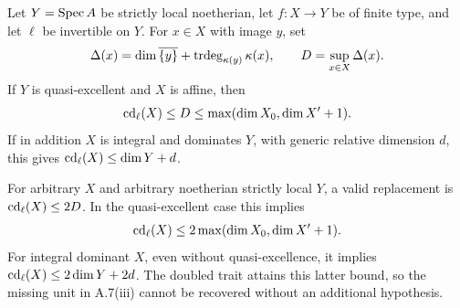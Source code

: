 \begin{theorem}
\label{A:relative-affine}
Let $Y=\operatorname{Spec} A$ be strictly local noetherian, let $f:X\to Y$ be of finite type, and let $\ell$ be invertible on $Y$. For $x\in X$ with image $y$, set
\[
\Delta(x)=\dim\overline{\{y\}}+\operatorname{trdeg}_{\kappa(y)}\kappa(x),
\qquad D=\sup_{x\in X}\Delta(x).
\]
If $Y$ is quasi-excellent and $X$ is affine, then
\[
\operatorname{cd}_\ell(X)\leq D\leq\max(\dim X_0,\dim X'+1).
\]
If in addition $X$ is integral and dominates $Y$, with generic relative dimension $d$, this gives $\operatorname{cd}_\ell(X)\leq\dim Y+d$.

For arbitrary $X$ and arbitrary noetherian strictly local $Y$, a valid replacement is $\operatorname{cd}_\ell(X)\leq2D$. In the quasi-excellent case this implies
\[
\operatorname{cd}_\ell(X)\leq2\max(\dim X_0,\dim X'+1).
\]
For integral dominant $X$, even without quasi-excellence, it implies
$\operatorname{cd}_\ell(X)\leq2\dim Y+2d$. The doubled trait attains this latter bound, so the missing unit in A.7(iii) cannot be recovered without an additional hypothesis.
\end{theorem}

